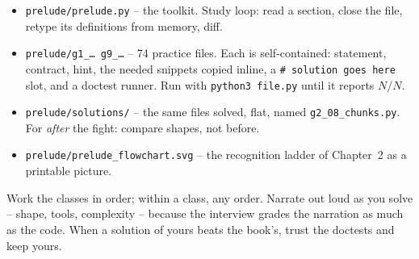 \documentclass[11pt,letterpaper]{book}
\begin{document}
\begin{itemize}
\item \texttt{prelude/prelude.py} -- the toolkit. Study loop: read a section,
close the file, retype its definitions from memory, diff.
\item \texttt{prelude/g1\_\ldots{} g9\_\ldots} -- 74 practice files. Each is
self-contained: statement, contract, hint, the needed snippets copied inline,
a \texttt{\# solution goes here} slot, and a doctest runner. Run with
\texttt{python3 file.py} until it reports $N/N$.
\item \texttt{prelude/solutions/} -- the same files solved, flat, named
\texttt{g2\_08\_chunks.py}. For \emph{after} the fight: compare shapes, not
before.
\item \texttt{prelude/prelude\_flowchart.svg} -- the recognition ladder of
Chapter~2 as a printable picture.
\end{itemize}

Work the classes in order; within a class, any order. Narrate out loud as you
solve -- shape, tools, complexity -- because the interview grades the
narration as much as the code. When a solution of yours beats the book's,
trust the doctests and keep yours.
\backmatter
\end{document}
